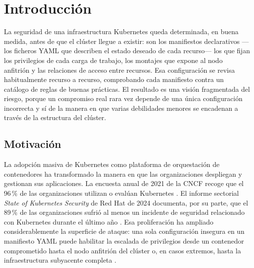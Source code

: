 \chapter{Introducción}
\label{cap:introduccion}

La seguridad de una infraestructura Kubernetes queda determinada, en
buena medida, antes de que el clúster llegue a existir: son los manifiestos
declarativos —los ficheros \ac{YAML} que describen el estado deseado de cada
recurso— los que fijan los privilegios de cada carga de trabajo, los
montajes que expone al nodo anfitrión y las relaciones de acceso entre recursos.
Esa configuración se revisa habitualmente recurso a recurso, comprobando cada
manifiesto contra un catálogo de reglas de buenas prácticas. El resultado es una
visión fragmentada del riesgo, porque un compromiso real rara vez depende de una
única configuración incorrecta y sí de la manera en que varias debilidades
menores se encadenan a través de la estructura del clúster.

\section{Motivación}

La adopción masiva de Kubernetes como plataforma de orquestación de
contenedores ha transformado la manera en que las organizaciones despliegan y
gestionan sus aplicaciones. La encuesta anual de 2021 de la \ac{CNCF} recoge que
el 96\,\% de las organizaciones utilizan o evalúan Kubernetes \citep{CNCF2022}.
El informe sectorial \textit{State of Kubernetes Security} de Red Hat de 2024
documenta, por su parte, que el 89\,\% de las organizaciones sufrió al menos un
incidente de seguridad relacionado con Kubernetes durante el último año
\citep{RedHat2024}. Esa proliferación ha ampliado considerablemente la
superficie de ataque: una sola configuración insegura en un manifiesto \ac{YAML} puede habilitar
la escalada de privilegios desde un contenedor comprometido hasta el nodo anfitrión
del clúster o, en casos extremos, hasta la infraestructura subyacente completa
\citep{NSA2022}.

